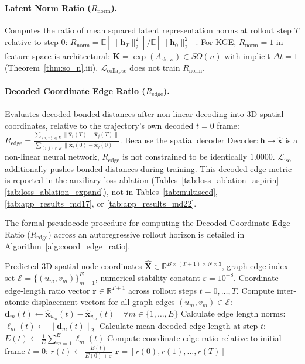 \documentclass{article}
\newcommand{\K}{\mathbf{K}}
\newcommand{\Ask}{A_{\mathrm{skew}}}
\newcommand{\GKE}{\textsc{KGE}}
\begin{document}
\paragraph{Latent Norm Ratio ($R_{\text{norm}}$).}
Computes the ratio of mean squared latent representation norms at rollout step $T$ relative to step $0$: $R_{\text{norm}} = \mathbb{E}[\|\mathbf{h}_T\|_2^2] / \mathbb{E}[\|\mathbf{h}_0\|_2^2]$. For \GKE{}, $R_{\text{norm}} = 1$ in feature space is architectural: $\K = \exp(\Ask) \in SO(n)$ with implicit $\Delta t=1$ (Theorem~\ref{thm:so_n}.iii). $\mathcal{L}_{\text{collapse}}$ does not train $R_{\text{norm}}$.

\paragraph{Decoded Coordinate Edge Ratio ($R_{\text{edge}}$).}
Evaluates decoded bonded distances after non-linear decoding into 3D spatial coordinates, relative to the trajectory's own decoded $t=0$ frame: $R_{\text{edge}} = \frac{\sum_{(i,j)\in E} \|\hat{\mathbf{x}}_i(T) - \hat{\mathbf{x}}_j(T)\|}{\sum_{(i,j)\in E} \|\hat{\mathbf{x}}_i(0) - \hat{\mathbf{x}}_j(0)\|}$. Because the spatial decoder $\text{Decoder}: \mathbf{h} \mapsto \hat{\mathbf{x}}$ is a non-linear neural network, $R_{\text{edge}}$ is not constrained to be identically $1.0000$. $\mathcal{L}_{\text{iso}}$ additionally pushes bonded distances during training. This decoded-edge metric is reported in the auxiliary-loss ablation (Tables~\ref{tab:loss_ablation_aspirin}--\ref{tab:loss_ablation_expand}), not in Tables~\ref{tab:multiseed}, \ref{tab:app_results_md17}, or \ref{tab:app_results_md22}.

The formal pseudocode procedure for computing the Decoded Coordinate Edge Ratio ($R_{\text{edge}}$) across an autoregressive rollout horizon is detailed in Algorithm~\ref{alg:coord_edge_ratio}.

\begin{algorithm}[H]
\caption{Decoded Coordinate Edge Length Ratio Computation ($R_{\text{edge}}$)}
\label{alg:coord_edge_ratio}
\begin{algorithmic}[1]
\Require Predicted 3D spatial node coordinates $\hat{\mathbf{X}} \in \mathbb{R}^{B \times (T+1) \times N \times 3}$, graph edge index set $\mathcal{E} = \{(u_m, v_m)\}_{m=1}^E$, numerical stability constant $\varepsilon = 10^{-8}$.
\Ensure Coordinate edge-length ratio vector $\mathbf{r} \in \mathbb{R}^{T+1}$ across rollout steps $t = 0, \dots, T$.
    \State Compute inter-atomic displacement vectors for all graph edges $(u_m, v_m) \in \mathcal{E}$:
    \Statex \qquad $\mathbf{d}_m(t) \leftarrow \hat{\mathbf{x}}_{u_m}(t) - \hat{\mathbf{x}}_{v_m}(t) \quad \forall m \in \{1, \dots, E\}$
    \State Calculate edge length norms: $\ell_m(t) \leftarrow \|\mathbf{d}_m(t)\|_2$
    \State Calculate mean decoded edge length at step $t$: $E(t) \leftarrow \frac{1}{E} \sum_{m=1}^E \ell_m(t)$
    \State Compute coordinate edge ratio relative to initial frame $t=0$:
    \Statex \qquad $r(t) \leftarrow \frac{E(t)}{E(0) + \varepsilon}$
\EndFor
\State \Return $\mathbf{r} = [r(0), r(1), \dots, r(T)]$
\end{algorithmic}
\end{algorithm}
\end{document}
